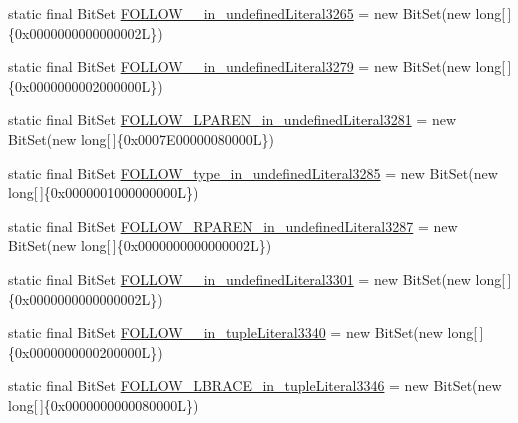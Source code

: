 \begin{DoxyCompactItemize}
\item 
static final Bit\-Set \hyperlink{classorg_1_1tzi_1_1use_1_1parser_1_1testsuite_1_1_test_suite_parser_a6525879d50cd6ba0054a85b3311d669f}{F\-O\-L\-L\-O\-W\-\_\-\_\-in\-\_\-undefined\-Literal3265} = new Bit\-Set(new long\mbox{[}$\,$\mbox{]}\{0x0000000000000002\-L\})
\item 
static final Bit\-Set \hyperlink{classorg_1_1tzi_1_1use_1_1parser_1_1testsuite_1_1_test_suite_parser_a693b205db323a1b0ce2539279250406a}{F\-O\-L\-L\-O\-W\-\_\-\_\-in\-\_\-undefined\-Literal3279} = new Bit\-Set(new long\mbox{[}$\,$\mbox{]}\{0x0000000002000000\-L\})
\item 
static final Bit\-Set \hyperlink{classorg_1_1tzi_1_1use_1_1parser_1_1testsuite_1_1_test_suite_parser_adceef47dfccb72552b0b1b9937dbc543}{F\-O\-L\-L\-O\-W\-\_\-\-L\-P\-A\-R\-E\-N\-\_\-in\-\_\-undefined\-Literal3281} = new Bit\-Set(new long\mbox{[}$\,$\mbox{]}\{0x0007\-E00000080000\-L\})
\item 
static final Bit\-Set \hyperlink{classorg_1_1tzi_1_1use_1_1parser_1_1testsuite_1_1_test_suite_parser_ae819bf0da1d0b8b2adfa1a796720b124}{F\-O\-L\-L\-O\-W\-\_\-type\-\_\-in\-\_\-undefined\-Literal3285} = new Bit\-Set(new long\mbox{[}$\,$\mbox{]}\{0x0000001000000000\-L\})
\item 
static final Bit\-Set \hyperlink{classorg_1_1tzi_1_1use_1_1parser_1_1testsuite_1_1_test_suite_parser_a53075abe93e06278b140f5baf7ea0d12}{F\-O\-L\-L\-O\-W\-\_\-\-R\-P\-A\-R\-E\-N\-\_\-in\-\_\-undefined\-Literal3287} = new Bit\-Set(new long\mbox{[}$\,$\mbox{]}\{0x0000000000000002\-L\})
\item 
static final Bit\-Set \hyperlink{classorg_1_1tzi_1_1use_1_1parser_1_1testsuite_1_1_test_suite_parser_a36b25f224ffa60495841b4c170b68d54}{F\-O\-L\-L\-O\-W\-\_\-\_\-in\-\_\-undefined\-Literal3301} = new Bit\-Set(new long\mbox{[}$\,$\mbox{]}\{0x0000000000000002\-L\})
\item 
static final Bit\-Set \hyperlink{classorg_1_1tzi_1_1use_1_1parser_1_1testsuite_1_1_test_suite_parser_a1f45b59d9b5396f7f627e5ebf4774d33}{F\-O\-L\-L\-O\-W\-\_\-\_\-in\-\_\-tuple\-Literal3340} = new Bit\-Set(new long\mbox{[}$\,$\mbox{]}\{0x0000000000200000\-L\})
\item 
static final Bit\-Set \hyperlink{classorg_1_1tzi_1_1use_1_1parser_1_1testsuite_1_1_test_suite_parser_a339c46d09be75a489dc7f97bff8f0b18}{F\-O\-L\-L\-O\-W\-\_\-\-L\-B\-R\-A\-C\-E\-\_\-in\-\_\-tuple\-Literal3346} = new Bit\-Set(new long\mbox{[}$\,$\mbox{]}\{0x0000000000080000\-L\})
\item 

\end{DoxyCompactItemize}

